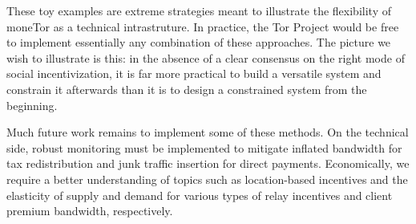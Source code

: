 These toy examples are extreme strategies meant to illustrate the flexibility of
moneTor as a technical intrastruture. In practice, the Tor Project would be free
to implement essentially any combination of these approaches. The picture we
wish to illustrate is this: in the absence of a clear consensus on the right
mode of social incentivization, it is far more practical to build a versatile
system and constrain it afterwards than it is to design a constrained system
from the beginning.

Much future work remains to implement some of these methods. On the technical
side, robust monitoring must be implemented to mitigate inflated bandwidth for
tax redistribution and junk traffic insertion for direct payments. Economically,
we require a better understanding of topics such as location-based incentives
and the elasticity of supply and demand for various types of relay incentives
and client premium bandwidth, respectively.


